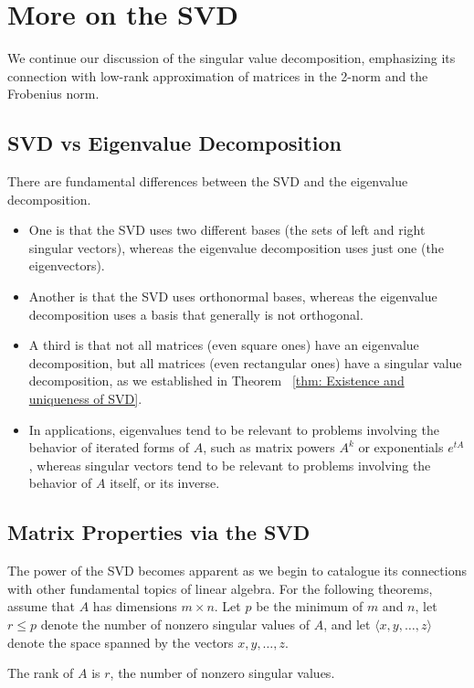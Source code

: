 \chapter{More on the SVD} 
We continue our discussion of the singular value decomposition, emphasizing its connection with low-rank approximation of matrices in the 2-norm and the Frobenius norm.

\section{SVD vs Eigenvalue Decomposition}
There are fundamental differences between the SVD and the eigenvalue decomposition. 
\begin{itemize}
    \item One is that the SVD uses two different bases (the sets of left and right singular vectors), whereas the eigenvalue decomposition uses just one (the eigenvectors).
    \item Another is that the SVD uses orthonormal bases, whereas the eigenvalue decomposition uses a basis that generally is not orthogonal.
    \item A third is that not all matrices (even square ones) have an eigenvalue decomposition, but all matrices (even rectangular ones) have a singular value decomposition, as we established in Theorem ~\ref{thm: Existence and uniqueness of SVD}.
    \item In applications, eigenvalues tend to be relevant to problems involving the behavior of iterated forms of $A$, such as matrix powers $A^k$ or exponentials $e^{t A}$, whereas singular vectors tend to be relevant to problems involving the behavior of $A$ itself, or its inverse.
\end{itemize}

\section{Matrix Properties via the SVD}
The power of the SVD becomes apparent as we begin to catalogue its connections with other fundamental topics of linear algebra. For the following theorems, assume that $A$ has dimensions $m \times n$. Let $p$ be the minimum of $m$ and $n$, let $r \leq p$ denote the number of nonzero singular values of $A$, and let $\langle x, y, \ldots, z\rangle$ denote the space spanned by the vectors $x, y, \ldots, z$.

\begin{theorem}
\label{thm:rank of svd }
The rank of $A$ is $r$, the number of nonzero singular values.
\end{theorem}


